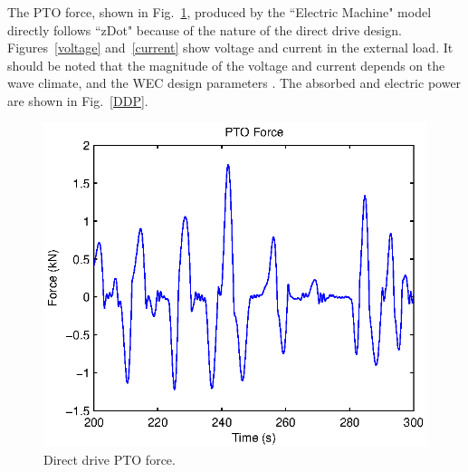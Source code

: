 \documentclass[twocolumn,10pt]{asme2e}
\begin{document}

The PTO force, shown in Fig.~\ref{DD_Fpto}, produced by the ``Electric Machine" model directly follows ``zDot" because of the nature of the direct drive design. Figures~\ref{voltage} and~\ref{current} show voltage and current in the external load. It should be noted that the magnitude of the voltage and current depends on the wave climate, and the WEC design parameters \cite{prudell2009novel}.  The absorbed and electric power are shown in Fig.~\ref{DDP}. 

\begin{figure}[t]
    \centering
    \includegraphics[width=1\columnwidth]{Images/DDFpto}
    \caption{Direct drive PTO force.}
    \label{DD_Fpto}
    \end{figure}
\end{document}
